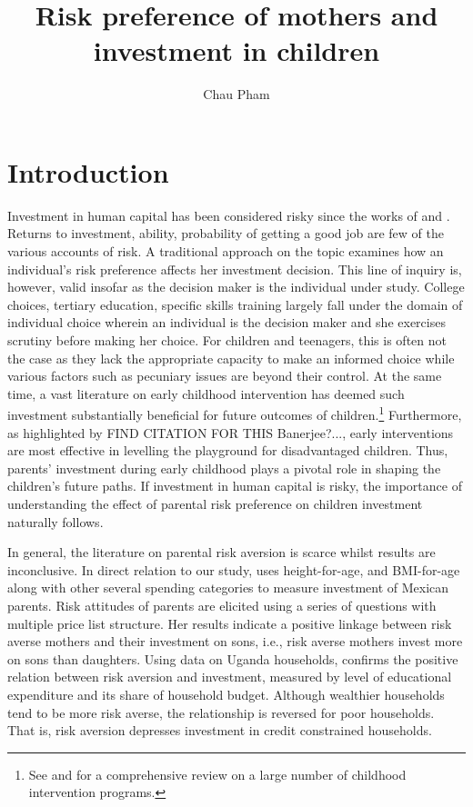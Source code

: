 \documentclass[]{article}
\title{Risk preference of mothers and investment in children}
\author{Chau Pham}
\begin{document}
\maketitle
\onehalfspacing

\section{Introduction}
Investment in human capital has been considered risky since the works of \citet{becker2009human, levhari1974effect} and \citet{schultz1971investment}. Returns to investment, ability, probability of getting a good job are few of the various accounts of risk. A traditional approach on the topic examines how an individual's risk preference affects her investment decision. This line of inquiry is, however, valid insofar as the decision maker is the individual under study. College choices, tertiary education, specific skills training largely fall under the domain of individual choice wherein an individual is the decision maker and she exercises scrutiny before making her choice. For children and teenagers, this is often not the case as they lack the appropriate capacity to make an informed choice while various factors such as pecuniary issues are beyond their control. At the same  time, a vast literature on early childhood intervention has deemed such investment substantially beneficial for future outcomes of children.\footnote{See \citet{Currie2001} and \citet{NORES2010} for a comprehensive review on a large number of childhood intervention programs.} Furthermore, as highlighted by {\color{red}FIND CITATION FOR THIS Banerjee?...}, early interventions are most effective in levelling the playground for disadvantaged children. Thus, parents' investment during early childhood plays a pivotal role in shaping the children's future paths. If investment in human capital is risky, the importance of understanding the effect of parental risk preference on children investment naturally follows.

In general, the literature on parental risk aversion is scarce whilst results are inconclusive. In direct relation to our study, \citet{sovero2018risk} uses height-for-age, and BMI-for-age along with other several spending categories to measure investment of Mexican parents. Risk attitudes of parents are elicited using a series of questions with multiple price list structure. Her results indicate a positive linkage between risk averse mothers and their investment on sons, i.e., risk averse mothers invest more on sons than daughters. Using data on Uganda households, \citet{tabetando2019parental} confirms the positive relation between risk aversion and investment, measured by level of educational expenditure and its share of household budget. Although wealthier households tend to be more risk averse, the relationship is reversed for poor households. That is, risk aversion depresses investment in credit constrained households.      
\end{document}
